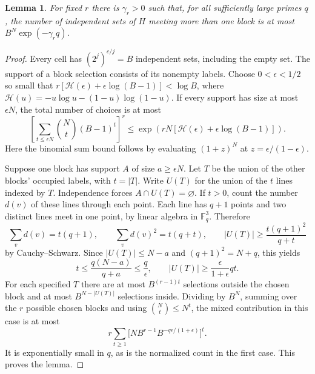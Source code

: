 \documentclass[11pt,a4paper]{article}
\newtheorem{lemma}[theorem]{Lemma}
\begin{document}
\begin{lemma}\label{lem:projective-mixing}
For fixed $r$ there is $\gamma_r>0$ such that, for all sufficiently
large primes $q$, the number of independent sets of $H$ meeting more than
one block is at most $B^N\exp(-\gamma_r q)$.
\end{lemma}
\begin{proof}
Every cell has $(2^j)^{c/j}=B$ independent sets, including the empty
set. The support of a block selection consists of its nonempty labels.
Choose $0<\epsilon<1/2$ so small that
$r[\mathcal H(\epsilon)+\epsilon\log(B-1)]<\log B$, where
$\mathcal H(u)=-u\log u-(1-u)\log(1-u)$. If every support has size
at most $\epsilon N$, the total number of choices is at most
\[
 \left[\sum_{t\le\epsilon N}\binom Nt(B-1)^t\right]^r
 \le \exp\!\left(rN[\mathcal H(\epsilon)+\epsilon\log(B-1)]\right).
\]
Here the binomial sum bound follows by evaluating $(1+z)^N$ at
$z=\epsilon/(1-\epsilon)$.

Suppose one block has support $A$ of size $a\ge\epsilon N$.
Let $T$ be the union of the other blocks' occupied labels, with $t=|T|$.
Write $U(T)$ for the union of the $t$ lines indexed by $T$. Independence
forces $A\cap U(T)=\varnothing$. If $t>0$, count the number $d(v)$ of
these lines through each point. Each line has $q+1$ points and two distinct
lines meet in one point, by linear algebra in $\mathbb F_q^3$. Therefore
\[
 \sum_v d(v)=t(q+1),\qquad \sum_v d(v)^2=t(q+t),\qquad
 |U(T)|\ge\frac{t(q+1)^2}{q+t}
\]
by Cauchy--Schwarz. Since $|U(T)|\le N-a$ and $(q+1)^2=N+q$, this yields
\[
 t\le\frac{q(N-a)}{q+a}\le\frac q\epsilon,
 \qquad |U(T)|\ge\frac{\epsilon}{1+\epsilon}qt.
\]
For each specified $T$ there are at most $B^{(r-1)t}$ selections outside
the chosen block and at most $B^{N-|U(T)|}$ selections inside. Dividing
by $B^N$, summing over the $r$ possible chosen blocks and using
$\binom Nt\le N^t$, the mixed contribution in this case is at most
\[
 r\sum_{t\ge1}\bigl[N B^{r-1}B^{-q\epsilon/(1+\epsilon)}\bigr]^t.
\]
It is exponentially small in $q$, as is the normalized count in the
first case. This proves the lemma.
\end{proof}
\end{document}
